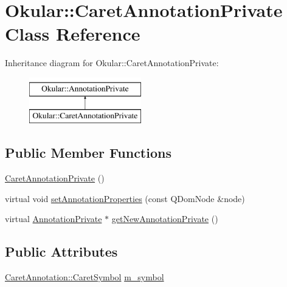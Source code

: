 \hypertarget{classOkular_1_1CaretAnnotationPrivate}{\section{Okular\+:\+:Caret\+Annotation\+Private Class Reference}
\label{classOkular_1_1CaretAnnotationPrivate}
}
Inheritance diagram for Okular\+:\+:Caret\+Annotation\+Private\+:\begin{figure}[H]
\begin{center}
\leavevmode
\includegraphics[height=2.000000cm]{classOkular_1_1CaretAnnotationPrivate}
\end{center}
\end{figure}
\subsection*{Public Member Functions}
\begin{DoxyCompactItemize}
\item 
\hyperlink{classOkular_1_1CaretAnnotationPrivate_abd3a551814d37c3662fa9c4f4f04070b}{Caret\+Annotation\+Private} ()
\item 
virtual void \hyperlink{classOkular_1_1CaretAnnotationPrivate_a02d97e47b70b09cbaac6e270519ac6f1}{set\+Annotation\+Properties} (const Q\+Dom\+Node \&node)
\item 
virtual \hyperlink{classOkular_1_1AnnotationPrivate}{Annotation\+Private} $\ast$ \hyperlink{classOkular_1_1CaretAnnotationPrivate_ad2c2ff9e13dd507768bafdd207371ea0}{get\+New\+Annotation\+Private} ()
\end{DoxyCompactItemize}
\subsection*{Public Attributes}
\begin{DoxyCompactItemize}
\item 
\hyperlink{classOkular_1_1CaretAnnotation_a0fa75d6ac84d6e08aae0561b55e98695}{Caret\+Annotation\+::\+Caret\+Symbol} \hyperlink{classOkular_1_1CaretAnnotationPrivate_ae93f5592157c6c38ceb239b5b1c31aae}{m\+\_\+symbol}
\end{DoxyCompactItemize}


